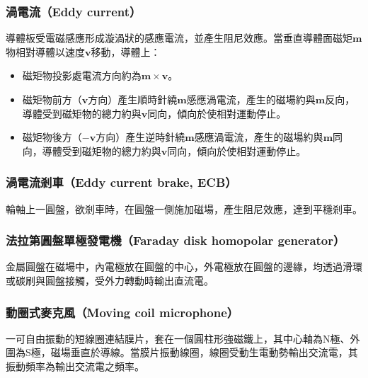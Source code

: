 \documentclass[a4paper,12pt]{report}
\begin{document}
\begin{itemize}
\subsubsection{渦電流（Eddy current）}
導體板受電磁感應形成漩渦狀的感應電流，並產生阻尼效應。當垂直導體面磁矩$\mathbf{m}$物相對導體以速度$\mathbf{v}$移動，導體上：
\begin{itemize}
\item 磁矩物投影處電流方向約為$\mathbf{m}\times\mathbf{v}$。
\item 磁矩物前方（$\mathbf{v}$方向）產生順時針繞$\mathbf{m}$感應渦電流，產生的磁場約與$\mathbf{m}$反向，導體受到磁矩物的總力約與$\mathbf{v}$同向，傾向於使相對運動停止。
\item 磁矩物後方（$-\mathbf{v}$方向）產生逆時針繞$\mathbf{m}$感應渦電流，產生的磁場約與$\mathbf{m}$同向，導體受到磁矩物的總力約與$\mathbf{v}$同向，傾向於使相對運動停止。
\end{itemize}
\subsubsection{渦電流剎車（Eddy current brake, ECB）}
輪軸上一圓盤，欲剎車時，在圓盤一側施加磁場，產生阻尼效應，達到平穩剎車。
\subsubsection{法拉第圓盤單極發電機（Faraday disk homopolar generator）}
金屬圓盤在磁場中，內電極放在圓盤的中心，外電極放在圓盤的邊緣，均透過滑環或碳刷與圓盤接觸，受外力轉動時輸出直流電。
\subsubsection{動圈式麥克風（Moving coil microphone）}
一可自由振動的短線圈連結膜片，套在一個圓柱形強磁鐵上，其中心軸為N極、外圍為S極，磁場垂直於導線。當膜片振動線圈，線圈受動生電動勢輸出交流電，其振動頻率為輸出交流電之頻率。

\end{itemize}
\end{document}
